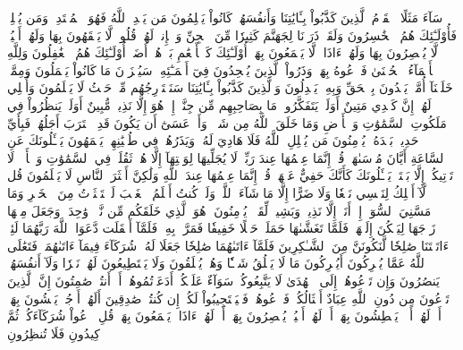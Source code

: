 سَآءَ مَثَلًا ٱلۡقَوۡمُ ٱلَّذِينَ كَذَّبُواْ بِـَٔايَٰتِنَا وَأَنفُسَهُمۡ كَانُواْ يَظۡلِمُونَ
مَن يَهۡدِ ٱللَّهُ فَهُوَ ٱلۡمُهۡتَدِيۖ وَمَن يُضۡلِلۡ فَأُوْلَـٰٓئِكَ هُمُ ٱلۡخَٰسِرُونَ
وَلَقَدۡ ذَرَأۡنَا لِجَهَنَّمَ كَثِيرٗا مِّنَ ٱلۡجِنِّ وَٱلۡإِنسِۖ لَهُمۡ قُلُوبٞ لَّا يَفۡقَهُونَ بِهَا وَلَهُمۡ أَعۡيُنٞ لَّا يُبۡصِرُونَ بِهَا وَلَهُمۡ ءَاذَانٞ لَّا يَسۡمَعُونَ بِهَآۚ أُوْلَـٰٓئِكَ كَٱلۡأَنۡعَٰمِ بَلۡ هُمۡ أَضَلُّۚ أُوْلَـٰٓئِكَ هُمُ ٱلۡغَٰفِلُونَ
وَلِلَّهِ ٱلۡأَسۡمَآءُ ٱلۡحُسۡنَىٰ فَٱدۡعُوهُ بِهَاۖ وَذَرُواْ ٱلَّذِينَ يُلۡحِدُونَ فِيٓ أَسۡمَـٰٓئِهِۦۚ سَيُجۡزَوۡنَ مَا كَانُواْ يَعۡمَلُونَ
وَمِمَّنۡ خَلَقۡنَآ أُمَّةٞ يَهۡدُونَ بِٱلۡحَقِّ وَبِهِۦ يَعۡدِلُونَ
وَٱلَّذِينَ كَذَّبُواْ بِـَٔايَٰتِنَا سَنَسۡتَدۡرِجُهُم مِّنۡ حَيۡثُ لَا يَعۡلَمُونَ
وَأُمۡلِي لَهُمۡۚ إِنَّ كَيۡدِي مَتِينٌ
أَوَلَمۡ يَتَفَكَّرُواْۗ مَا بِصَاحِبِهِم مِّن جِنَّةٍۚ إِنۡ هُوَ إِلَّا نَذِيرٞ مُّبِينٌ
أَوَلَمۡ يَنظُرُواْ فِي مَلَكُوتِ ٱلسَّمَٰوَٰتِ وَٱلۡأَرۡضِ وَمَا خَلَقَ ٱللَّهُ مِن شَيۡءٖ وَأَنۡ عَسَىٰٓ أَن يَكُونَ قَدِ ٱقۡتَرَبَ أَجَلُهُمۡۖ فَبِأَيِّ حَدِيثِۭ بَعۡدَهُۥ يُؤۡمِنُونَ
مَن يُضۡلِلِ ٱللَّهُ فَلَا هَادِيَ لَهُۥۚ وَيَذَرُهُمۡ فِي طُغۡيَٰنِهِمۡ يَعۡمَهُونَ
يَسۡـَٔلُونَكَ عَنِ ٱلسَّاعَةِ أَيَّانَ مُرۡسَىٰهَاۖ قُلۡ إِنَّمَا عِلۡمُهَا عِندَ رَبِّيۖ لَا يُجَلِّيهَا لِوَقۡتِهَآ إِلَّا هُوَۚ ثَقُلَتۡ فِي ٱلسَّمَٰوَٰتِ وَٱلۡأَرۡضِۚ لَا تَأۡتِيكُمۡ إِلَّا بَغۡتَةٗۗ يَسۡـَٔلُونَكَ كَأَنَّكَ حَفِيٌّ عَنۡهَاۖ قُلۡ إِنَّمَا عِلۡمُهَا عِندَ ٱللَّهِ وَلَٰكِنَّ أَكۡثَرَ ٱلنَّاسِ لَا يَعۡلَمُونَ
قُل لَّآ أَمۡلِكُ لِنَفۡسِي نَفۡعٗا وَلَا ضَرًّا إِلَّا مَا شَآءَ ٱللَّهُۚ وَلَوۡ كُنتُ أَعۡلَمُ ٱلۡغَيۡبَ لَٱسۡتَكۡثَرۡتُ مِنَ ٱلۡخَيۡرِ وَمَا مَسَّنِيَ ٱلسُّوٓءُۚ إِنۡ أَنَا۠ إِلَّا نَذِيرٞ وَبَشِيرٞ لِّقَوۡمٖ يُؤۡمِنُونَ
۞هُوَ ٱلَّذِي خَلَقَكُم مِّن نَّفۡسٖ وَٰحِدَةٖ وَجَعَلَ مِنۡهَا زَوۡجَهَا لِيَسۡكُنَ إِلَيۡهَاۖ فَلَمَّا تَغَشَّىٰهَا حَمَلَتۡ حَمۡلًا خَفِيفٗا فَمَرَّتۡ بِهِۦۖ فَلَمَّآ أَثۡقَلَت دَّعَوَا ٱللَّهَ رَبَّهُمَا لَئِنۡ ءَاتَيۡتَنَا صَٰلِحٗا لَّنَكُونَنَّ مِنَ ٱلشَّـٰكِرِينَ
فَلَمَّآ ءَاتَىٰهُمَا صَٰلِحٗا جَعَلَا لَهُۥ شُرَكَآءَ فِيمَآ ءَاتَىٰهُمَاۚ فَتَعَٰلَى ٱللَّهُ عَمَّا يُشۡرِكُونَ
أَيُشۡرِكُونَ مَا لَا يَخۡلُقُ شَيۡـٔٗا وَهُمۡ يُخۡلَقُونَ
وَلَا يَسۡتَطِيعُونَ لَهُمۡ نَصۡرٗا وَلَآ أَنفُسَهُمۡ يَنصُرُونَ
وَإِن تَدۡعُوهُمۡ إِلَى ٱلۡهُدَىٰ لَا يَتَّبِعُوكُمۡۚ سَوَآءٌ عَلَيۡكُمۡ أَدَعَوۡتُمُوهُمۡ أَمۡ أَنتُمۡ صَٰمِتُونَ
إِنَّ ٱلَّذِينَ تَدۡعُونَ مِن دُونِ ٱللَّهِ عِبَادٌ أَمۡثَالُكُمۡۖ فَٱدۡعُوهُمۡ فَلۡيَسۡتَجِيبُواْ لَكُمۡ إِن كُنتُمۡ صَٰدِقِينَ
أَلَهُمۡ أَرۡجُلٞ يَمۡشُونَ بِهَآۖ أَمۡ لَهُمۡ أَيۡدٖ يَبۡطِشُونَ بِهَآۖ أَمۡ لَهُمۡ أَعۡيُنٞ يُبۡصِرُونَ بِهَآۖ أَمۡ لَهُمۡ ءَاذَانٞ يَسۡمَعُونَ بِهَاۗ قُلِ ٱدۡعُواْ شُرَكَآءَكُمۡ ثُمَّ كِيدُونِ فَلَا تُنظِرُونِ
